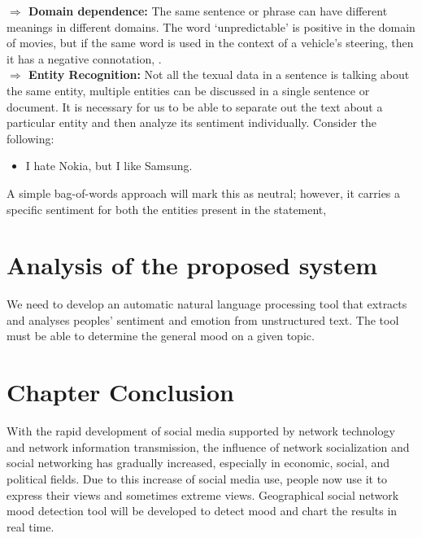 \textbf{$\Rightarrow$ Domain dependence:} The same sentence or phrase can have different meanings in
different domains. The word ‘unpredictable’ is positive in the domain of movies, but if
the same word is used in the context of a vehicle's steering, then it has a negative
connotation, \cite{ref20}.\\


\textbf{$\Rightarrow$ Entity Recognition:} Not all the texual data in a sentence is talking about the same entity, multiple entities can be discussed in a single sentence or document. It is necessary for us to be able to separate out the text about a particular entity and then analyze its sentiment individually. Consider the
following:
\begin{itemize}
\item I hate Nokia, but I like Samsung.
\end{itemize}
A simple bag-of-words approach will mark this as neutral; however, it carries a specific sentiment
for both the entities present in the statement,\cite{ref20}



\section{Analysis of the proposed system}
We need to develop an automatic natural language processing tool that extracts and analyses
peoples' sentiment and emotion from unstructured text. The tool must be able to determine the general mood on a given topic.

\section{Chapter Conclusion}
With the rapid development of social media supported by network technology and network
information transmission, the influence of network socialization and social networking has
gradually increased, especially in economic, social, and political fields. Due to this increase of
social media use, people now use it to express their views and sometimes extreme views. Geographical
social network mood detection tool will be developed to detect mood and chart the results in real time.\\

